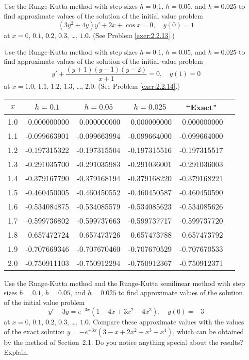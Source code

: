 \documentclass{ximera}
\begin{document}
\begin{problem}\label{exer:3.3.11} 
Use the Runge-Kutta method with step sizes $h=0.1$, $h=0.05$, and
$h=0.025$ to find approximate values of the solution of the initial
value problem
$$
(3y^2+4y)y'+2x+\cos x=0, \quad y(0)=1 
$$
at $x=0$, $0.1$, $0.2$, $0.3$, \dots, $1.0$.  (See Problem \ref{exer:2.2.13}.)
\end{problem}

\begin{problem}\label{exer:3.3.12}
Use the Runge-Kutta method with step sizes $h=0.1$, $h=0.05$, and
$h=0.025$ to find approximate values of the solution of the initial
value problem
$$
y'+\frac{(y+1)(y-1)(y-2)}{x+1}=0, \quad y(1)=0
$$
at $x=1.0$, $1.1$, $1.2$, $1.3$, \dots, $2.0$.  (See Problem \ref{exer:2.2.14}.)

\begin{solution}
    {\small
\begin{tabular}{|c|r|r|r|r|r|}
\hline
\multicolumn{1}{|c|}{$x$}&
\multicolumn{1}{|c|}{$h=0.1$}&
\multicolumn{1}{|c|}{$h=0.05$}&
\multicolumn{1}{|c|}{$h=0.025$}&
\multicolumn{1}{|c|}{``Exact"}\\ \hline
1.0 &  0.000000000 &  0.000000000 &  0.000000000 &  0.000000000 \\
1.1 & -0.099663901 & -0.099663994 & -0.099664000 & -0.099664000 \\
1.2 & -0.197315322 & -0.197315504 & -0.197315516 & -0.197315517 \\
1.3 & -0.291035700 & -0.291035983 & -0.291036001 & -0.291036003 \\
1.4 & -0.379167790 & -0.379168194 & -0.379168220 & -0.379168221 \\
1.5 & -0.460450005 & -0.460450552 & -0.460450587 & -0.460450590 \\
1.6 & -0.534084875 & -0.534085579 & -0.534085623 & -0.534085626 \\
1.7 & -0.599736802 & -0.599737663 & -0.599737717 & -0.599737720 \\
1.8 & -0.657472724 & -0.657473726 & -0.657473788 & -0.657473792 \\
1.9 & -0.707669346 & -0.707670460 & -0.707670529 & -0.707670533 \\
2.0 & -0.750911103 & -0.750912294 & -0.750912367 & -0.750912371 \\
\hline
\end{tabular}}
\end{solution}
\end{problem}

\begin{problem}\label{exer:3.3.13}
Use the Runge-Kutta method and the Runge-Kutta  semilinear method
with step sizes
$h=0.1$, $h=0.05$, and $h=0.025$ to find approximate values of the
solution of the initial value problem
$$
y'+3y=e^{-3x}(1-4x+3x^2-4x^3),\quad y(0)=-3
$$
at $x=0$, $0.1$, $0.2$, $0.3$, \dots, $1.0$. Compare these approximate values with the values of the exact solution $y=-e^{-3x}(3-x+2x^2-x^3+x^4)$, which
can be obtained by the method of Section~2.1. Do
you notice anything special about the results? Explain.
\end{problem}
\end{document}
